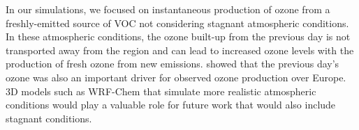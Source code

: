 In our simulations, we focused on instantaneous production of ozone from a freshly-emitted source of VOC not considering stagnant atmospheric conditions.
In these atmospheric conditions, the ozone built-up from the previous day is not transported away from the region and can lead to increased ozone levels with the production of fresh ozone from new emissions.  
\citet{Otero:2016} showed that the previous day's ozone was also an important driver for observed ozone production over Europe.
3D models such as WRF-Chem that simulate more realistic atmospheric conditions would play a valuable role for future work that would also include stagnant conditions.
